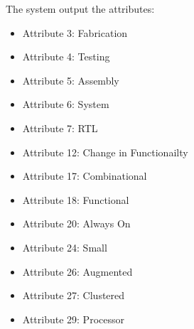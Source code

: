 The system output the attributes:
\begin{itemize}
	\item Attribute 3: Fabrication
	\item Attribute 4: Testing
	\item Attribute 5: Assembly
	\item Attribute 6: System
	\item Attribute 7: RTL
	\item Attribute 12: Change in Functionailty
	\item Attribute 17: Combinational
	\item Attribute 18: Functional
	\item Attribute 20: Always On
	\item Attribute 24: Small
	\item Attribute 26: Augmented
	\item Attribute 27: Clustered
	\item Attribute 29: Processor
\end{itemize}

